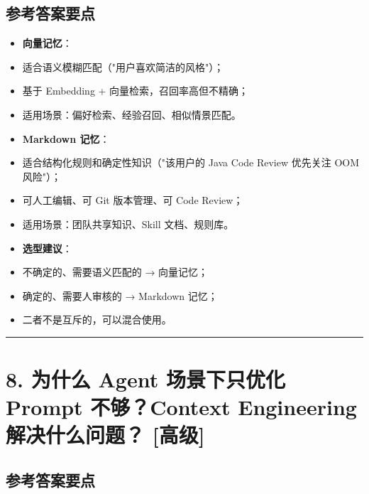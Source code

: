 \documentclass[9pt,a4paper,twocolumn]{ctexart}
\newcommand{\lvgao}{\usebox{\badgegaobox}}
\def\lvgao{[高级]}%
\begin{document}
\subsection*{参考答案要点}

\begin{itemize}[itemsep=1pt, topsep=2pt]
  \item \textbf{向量记忆}：
  \item 适合语义模糊匹配（"用户喜欢简洁的风格"）；
  \item 基于 Embedding + 向量检索，召回率高但不精确；
  \item 适用场景：偏好检索、经验召回、相似情景匹配。
  \item \textbf{Markdown 记忆}：
  \item 适合结构化规则和确定性知识（"该用户的 Java Code Review 优先关注 OOM 风险"）；
  \item 可人工编辑、可 Git 版本管理、可 Code Review；
  \item 适用场景：团队共享知识、Skill 文档、规则库。
  \item \textbf{选型建议}：
  \item 不确定的、需要语义匹配的 → 向量记忆；
  \item 确定的、需要人审核的 → Markdown 记忆；
  \item 二者不是互斥的，可以混合使用。
\end{itemize}


\vspace{2pt}
\noindent\rule{\columnwidth}{0.3pt}\vspace{2pt}



\section*{8. 为什么 Agent 场景下只优化 Prompt 不够？Context Engineering 解决什么问题？ \lvgao{}}


\subsection*{参考答案要点}
\end{document}
